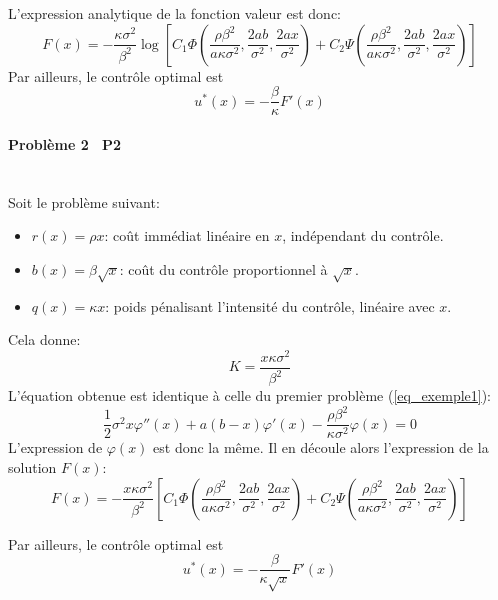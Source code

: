L'expression analytique de la fonction valeur est donc:
\begin{equation}\label{sol_control_1}
    F(x)=-\frac{\kappa \sigma^2}{\beta^2} \log\left[C_1\Phi\left(\frac{\rho\beta^2}{a\kappa \sigma^2},\frac{2ab}{\sigma^2},\frac{2ax}{\sigma^2}\right) + C_2\Psi\left(\frac{\rho\beta^2}{a\kappa \sigma^2},\frac{2ab}{\sigma^2},\frac{2ax}{\sigma^2}\right)\right]
\end{equation}
Par ailleurs, le contrôle optimal est
\begin{equation}\label{optimal_control_1}
    u^*(x)=-\frac{\beta}{\kappa}F'(x)
\end{equation}

\paragraph{Problème 2 \textemdash~P2}\label{p2}\phantom{}\\
\noindent Soit le problème suivant: 
\begin{itemize}
    \item $r(x) = \rho x$: coût immédiat linéaire en $x$, indépendant du contrôle.
    \item $b(x) = \beta \sqrt{x}$: coût du contrôle proportionnel à $\sqrt{x}$.
    \item $q(x) = \kappa x$: poids pénalisant l'intensité du contrôle, linéaire avec $x$.
\end{itemize}
Cela donne: 
\[
K=\frac{x\kappa \sigma^2}{\beta^2}
\]
L'équation obtenue est identique à celle du premier problème (\ref{eq_exemple1}): 
\[
\frac{1}{2}\sigma^2 x\varphi''(x) + a(b - x)\varphi'(x) - \frac{\rho\beta^2}{\kappa \sigma^2}\varphi(x) = 0
\]
L'expression de $\varphi(x)$ est donc la même. Il en découle alors l'expression de la solution $F(x)$: 
\begin{equation}\label{sol_control_2}
    F(x)=-\frac{x\kappa \sigma^2}{\beta^2}\left[C_1\Phi\left(\frac{\rho\beta^2}{a\kappa \sigma^2},\frac{2ab}{\sigma^2},\frac{2ax}{\sigma^2}\right) + C_2\Psi\left(\frac{\rho\beta^2}{a\kappa \sigma^2},\frac{2ab}{\sigma^2},\frac{2ax}{\sigma^2}\right)\right]
\end{equation}

Par ailleurs, le contrôle optimal est
\begin{equation}\label{optimal_control_2}
    u^*(x)=-\frac{\beta}{\kappa\sqrt{x}}F'(x)
\end{equation}

